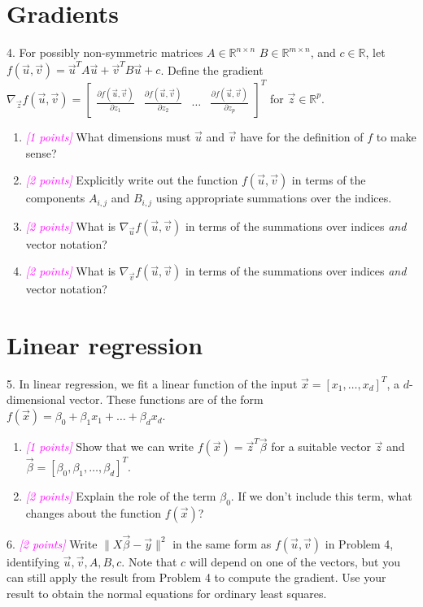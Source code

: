 \documentclass{article}
\newcommand{\R}{\mathbb{R}} %
\newcommand{\points}[1]{\small\textcolor{magenta}{\emph{[#1 points]}} \normalsize}
\begin{document}
\section*{Gradients}
4. For possibly non-symmetric matrices $A \in \R^{n \times n}$
$B \in \R^{m \times n}$,
and $c \in \R$, 
let $f(\vec u, \vec v) = \vec u^T A \vec u + \vec v^T B \vec u + c$. 
Define the gradient 
$
\nabla_{\vec z} f(\vec u, \vec v) = 
\begin{bmatrix} 
\frac{\partial f(\vec u, \vec v)}{\partial z_1} & 
\frac{\partial f(\vec u, \vec v)}{\partial z_2} & 
\dots & \frac{\partial f(\vec u, \vec v)}{\partial z_p} 
\end{bmatrix}^T
$ 
for $\vec z \in \R^p$.
\begin{enumerate}
\item \points{1} What dimensions must $\vec u$ and $\vec v$ have for the definition of $f$ to make sense?
\item \points{2} Explicitly write out the function $f(\vec u, \vec v)$ in terms of the components $A_{i,j}$ and $B_{i,j}$ using appropriate summations over the indices.
\item \points{2} What is $\nabla_{\vec u} f(\vec u, \vec v)$ 
  in terms of the summations over indices \emph{and} vector notation?
\item \points{2} What is $\nabla_{\vec v} f(\vec u, \vec v)$ 
  in terms of the summations over indices \emph{and} vector notation?
\end{enumerate}


\section*{Linear regression}
5. In linear regression, we fit a linear function of the input $\vec x = [x_1, \ldots, x_d]^T$, a $d$-dimensional vector. 
These functions are of the form 
$f(\vec x) = \beta_0 + \beta_1 x_1 + \ldots + \beta_d x_d$.
\begin{enumerate}
\item \points{1} Show that we can write $f(\vec x) = \vec z^T \vec \beta$ for a suitable vector $\vec z$ 
  and $\vec \beta = [\beta_0, \beta_1, \ldots, \beta_d]^T$.
\item \points{2} Explain the role of the term $\beta_0$. If we don't include this term, 
  what changes about the function $f(\vec x)$?
\end{enumerate}

6.  \points{2} Write $\| X \vec \beta - \vec y \|^2$ in the same form as $f(\vec u, \vec v)$ in Problem 4,
identifying $\vec u, \vec v, A, B, c$.
Note that $c$ will depend on one of the vectors, but you can still apply the result from Problem 4
to compute the gradient.
Use your result to obtain the normal equations for ordinary least squares. 
\end{document}
